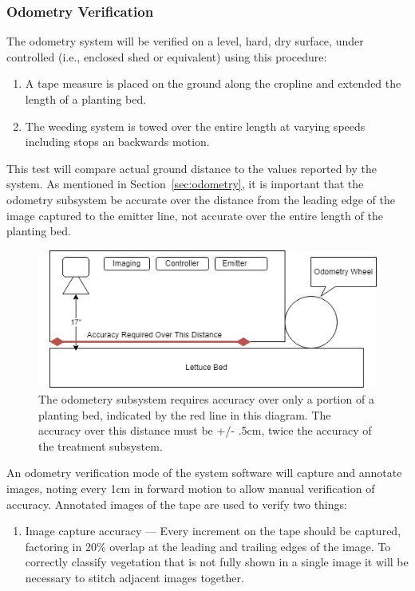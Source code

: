 \documentclass[12pt]{article}
\begin{document}
{\subsubsection{Odometry Verification}
The odometry system will be verified on a level, hard, dry surface, under controlled (i.e., enclosed shed or equivalent) using this procedure:
\begin{enumerate}
	\item{A tape measure is placed on the ground along the cropline and extended the length of a planting bed.}
	\item{The weeding system is towed over the entire length at varying speeds including stops an backwards motion.}
\end{enumerate}
This test will compare actual ground distance to the values reported by the system.  As mentioned in Section~\ref{sec:odometry}, it is important that the odometry subsystem be accurate over the distance from the leading edge of the image captured to the emitter line, not accurate over the entire length of the planting bed.
\begin{figure}[H]
	\centering
	\includegraphics[width=0.75\linewidth]{./figures/odometry-accuracy.jpg}
	\caption[Accuracy required from odometry subsystem]{The odometery subsystem requires accuracy over only a portion of a planting bed, indicated by the red line in this diagram.  The accuracy over this distance must be +/- .5cm, twice the accuracy of the treatment subsystem.}
	\label{fig:uml-system}
\end{figure}
An odometry verification mode of the system software will capture and annotate images, noting every 1cm in forward motion to allow manual verification of accuracy.  Annotated images of the tape are used to verify two things:
\begin{enumerate}
	\item{Image capture accuracy --- Every increment on the tape should be captured, factoring in 20\% overlap at the leading and trailing edges of the image. To correctly classify vegetation that is not fully shown in a single image it will be necessary to stitch adjacent images together.}

\end{enumerate}}
\end{document}
